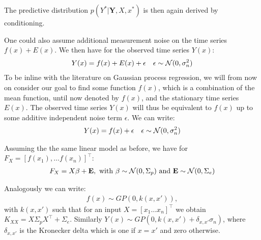 The predictive distribution $p(Y^{\ast} | \mathbf{Y}, X, x^{\ast})$ is then again derived by conditioning.

One could also assume additional measurement noise on the time series $f(x) + E(x)$.
We then have for the observed time series $Y(x)$:
\begin{align*}
    Y(x) = f(x) + E(x) + \epsilon   && \epsilon \sim \operatorname{\mathcal{N}}(0, \sigma_n^{2})
\end{align*}
To be inline with the literature on Gaussian process regression, we will from now on consider
our goal to find some function $f(x)$, which is a combination of the mean function, until now denoted by $f(x)$,
and the stationary time series $E(x)$.
The observed time series $Y(x)$ will thus be equivalent to $f(x)$ up to some additive independent noise term $\epsilon$.
We can write:
\begin{align*}
    Y(x) = f(x) + \epsilon && \epsilon \sim \operatorname{\mathcal{N}}(0, \sigma_n^{2})
\end{align*}

Assuming the the same linear model as before, we have for $F_X = [f(x_1), \dots f(x_n)]^{\top}$:
\begin{gather*}
    F_X = X \beta + \mathbf{E}, \text{ with $\beta \sim \operatorname{\mathcal{N}}(0, \Sigma_p)$ and $\mathbf{E} \sim \operatorname{\mathcal{N}}(0, \Sigma_e)$}
\end{gather*}
%

Analogously we can write:
\begin{gather*}
    f(x) \sim GP(0, k(x, x')),
\end{gather*}
with $k(x,x')$ such that for an input $X = [x_1 \dots x_n]^{\top}$ we obtain $K_{XX} =  X \Sigma_p X^{\top} + \Sigma_e$.
Similarly $Y(x) \sim GP(0, k(x, x') + \delta_{x,x'}\sigma_n)$,
where $\delta_{x,x'}$ is the Kronecker delta which is one if $x = x'$ and zero otherwise.

